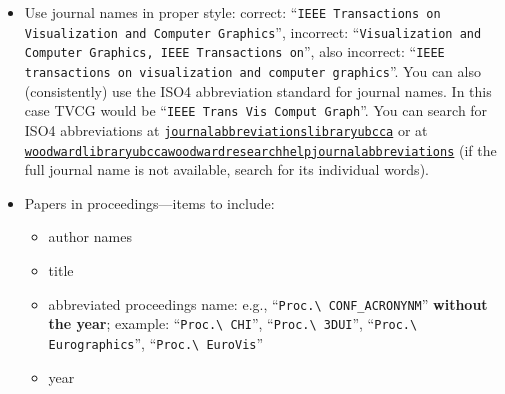 \documentclass[journal]{vgtc}                     %
\begin{document}
\begin{itemize}
  \item Use journal names in proper style: correct: ``\texttt{IEEE Transactions on Visualization and Computer Graphics}'', incorrect: ``\texttt{Visualization and Computer Graphics, IEEE Transactions on}'', also incorrect: ``\texttt{IEEE transactions on visualization and computer graphics}''.  You can also (consistently) use the ISO4 abbreviation standard for journal names. In this case TVCG would be ``\texttt{IEEE Trans Vis Comput Graph}''. You can search for ISO4 abbreviations at \href{https://journal-abbreviations.library.ubc.ca/}{\texttt{journal\discretionary{}{-}{-}abbreviationslibraryubcca}} or at \href{https://woodward.library.ubc.ca/woodward/research-help/journal-abbreviations/}{\texttt{woodwardlibraryubcca\discretionary{/}{}{/}woodward\discretionary{/}{}{/}research\discretionary{}{-}{-}help\discretionary{/}{}{/}journal\discretionary{}{-}{-}abbreviations}} (if the full journal name is not available, search for its individual words).
  \item Papers in proceedings---items to include:
        \begin{itemize}
  	      \item author names
  	      \item title
  	      \item abbreviated proceedings name: e.g., ``\texttt{Proc.\textbackslash{} CONF\_ACRONYNM}'' \textbf{without the year}; example: ``\texttt{Proc.\textbackslash{} CHI}'', ``\texttt{Proc.\textbackslash{} 3DUI}'', ``\texttt{Proc.\textbackslash{} Eurographics}'', ``\texttt{Proc.\textbackslash{} EuroVis}''
  	      \item year
        \end{itemize}


\end{itemize}
\end{document}
